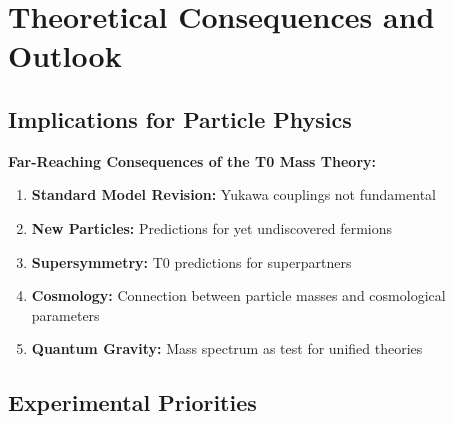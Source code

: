 \documentclass[12pt,a4paper]{article}
\begin{document}
	\section{Theoretical Consequences and Outlook}
	
	\subsection{Implications for Particle Physics}
	
	\begin{warning}
		\textbf{Far-Reaching Consequences of the T0 Mass Theory:}
		
		\begin{enumerate}
			\item \textbf{Standard Model Revision:} Yukawa couplings not fundamental
			
			\item \textbf{New Particles:} Predictions for yet undiscovered fermions
			
			\item \textbf{Supersymmetry:} T0 predictions for superpartners
			
			\item \textbf{Cosmology:} Connection between particle masses and cosmological parameters
			
			\item \textbf{Quantum Gravity:} Mass spectrum as test for unified theories
		\end{enumerate}
	\end{warning}
	
	\subsection{Experimental Priorities}
	
\end{document}
